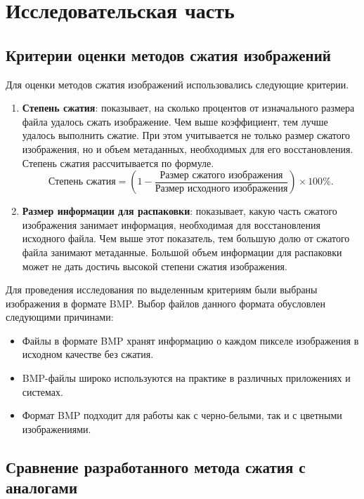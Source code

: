 
\chapter{Исследовательская часть}

\section{Критерии оценки методов сжатия изображений}

Для оценки методов сжатия изображений использовались следующие критерии.
\begin{enumerate}
    \item \textbf{Степень сжатия}: показывает, на сколько процентов от изначального размера файла удалось сжать изображение. Чем выше коэффициент, тем лучше удалось выполнить сжатие. При этом учитывается не только размер сжатого изображения, но и объем метаданных, необходимых для его восстановления. Степень сжатия рассчитывается по формуле.
    \begin{equation}
        \text{Степень сжатия} = \left(1 - \frac{\text{Размер сжатого изображения}}{\text{Размер исходного изображения}}\right) \times 100\%.
    \end{equation}
    \item \textbf{Размер информации для распаковки}: показывает, какую часть сжатого изображения занимает информация, необходимая для восстановления исходного файла. Чем выше этот показатель, тем большую долю от сжатого файла занимают метаданные. Большой объем информации для распаковки может не дать достичь высокой степени сжатия изображения.
\end{enumerate}

Для проведения исследования по выделенным критериям были выбраны изображения в формате BMP. Выбор файлов данного формата обусловлен следующими причинами:
\begin{itemize}
    \item Файлы в формате BMP хранят информацию о каждом пикселе изображения в исходном качестве без сжатия.
    \item BMP-файлы широко используются на практике в различных приложениях и системах.
    \item Формат BMP подходит для работы как с черно-белыми, так и с цветными изображениями.
\end{itemize}

\section{Сравнение разработанного метода сжатия с аналогами}

